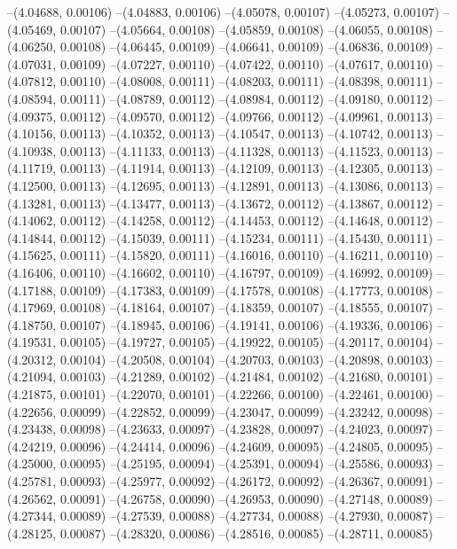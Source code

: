 --(4.04688, 0.00106)
--(4.04883, 0.00106)
--(4.05078, 0.00107)
--(4.05273, 0.00107)
--(4.05469, 0.00107)
--(4.05664, 0.00108)
--(4.05859, 0.00108)
--(4.06055, 0.00108)
--(4.06250, 0.00108)
--(4.06445, 0.00109)
--(4.06641, 0.00109)
--(4.06836, 0.00109)
--(4.07031, 0.00109)
--(4.07227, 0.00110)
--(4.07422, 0.00110)
--(4.07617, 0.00110)
--(4.07812, 0.00110)
--(4.08008, 0.00111)
--(4.08203, 0.00111)
--(4.08398, 0.00111)
--(4.08594, 0.00111)
--(4.08789, 0.00112)
--(4.08984, 0.00112)
--(4.09180, 0.00112)
--(4.09375, 0.00112)
--(4.09570, 0.00112)
--(4.09766, 0.00112)
--(4.09961, 0.00113)
--(4.10156, 0.00113)
--(4.10352, 0.00113)
--(4.10547, 0.00113)
--(4.10742, 0.00113)
--(4.10938, 0.00113)
--(4.11133, 0.00113)
--(4.11328, 0.00113)
--(4.11523, 0.00113)
--(4.11719, 0.00113)
--(4.11914, 0.00113)
--(4.12109, 0.00113)
--(4.12305, 0.00113)
--(4.12500, 0.00113)
--(4.12695, 0.00113)
--(4.12891, 0.00113)
--(4.13086, 0.00113)
--(4.13281, 0.00113)
--(4.13477, 0.00113)
--(4.13672, 0.00112)
--(4.13867, 0.00112)
--(4.14062, 0.00112)
--(4.14258, 0.00112)
--(4.14453, 0.00112)
--(4.14648, 0.00112)
--(4.14844, 0.00112)
--(4.15039, 0.00111)
--(4.15234, 0.00111)
--(4.15430, 0.00111)
--(4.15625, 0.00111)
--(4.15820, 0.00111)
--(4.16016, 0.00110)
--(4.16211, 0.00110)
--(4.16406, 0.00110)
--(4.16602, 0.00110)
--(4.16797, 0.00109)
--(4.16992, 0.00109)
--(4.17188, 0.00109)
--(4.17383, 0.00109)
--(4.17578, 0.00108)
--(4.17773, 0.00108)
--(4.17969, 0.00108)
--(4.18164, 0.00107)
--(4.18359, 0.00107)
--(4.18555, 0.00107)
--(4.18750, 0.00107)
--(4.18945, 0.00106)
--(4.19141, 0.00106)
--(4.19336, 0.00106)
--(4.19531, 0.00105)
--(4.19727, 0.00105)
--(4.19922, 0.00105)
--(4.20117, 0.00104)
--(4.20312, 0.00104)
--(4.20508, 0.00104)
--(4.20703, 0.00103)
--(4.20898, 0.00103)
--(4.21094, 0.00103)
--(4.21289, 0.00102)
--(4.21484, 0.00102)
--(4.21680, 0.00101)
--(4.21875, 0.00101)
--(4.22070, 0.00101)
--(4.22266, 0.00100)
--(4.22461, 0.00100)
--(4.22656, 0.00099)
--(4.22852, 0.00099)
--(4.23047, 0.00099)
--(4.23242, 0.00098)
--(4.23438, 0.00098)
--(4.23633, 0.00097)
--(4.23828, 0.00097)
--(4.24023, 0.00097)
--(4.24219, 0.00096)
--(4.24414, 0.00096)
--(4.24609, 0.00095)
--(4.24805, 0.00095)
--(4.25000, 0.00095)
--(4.25195, 0.00094)
--(4.25391, 0.00094)
--(4.25586, 0.00093)
--(4.25781, 0.00093)
--(4.25977, 0.00092)
--(4.26172, 0.00092)
--(4.26367, 0.00091)
--(4.26562, 0.00091)
--(4.26758, 0.00090)
--(4.26953, 0.00090)
--(4.27148, 0.00089)
--(4.27344, 0.00089)
--(4.27539, 0.00088)
--(4.27734, 0.00088)
--(4.27930, 0.00087)
--(4.28125, 0.00087)
--(4.28320, 0.00086)
--(4.28516, 0.00085)
--(4.28711, 0.00085)

